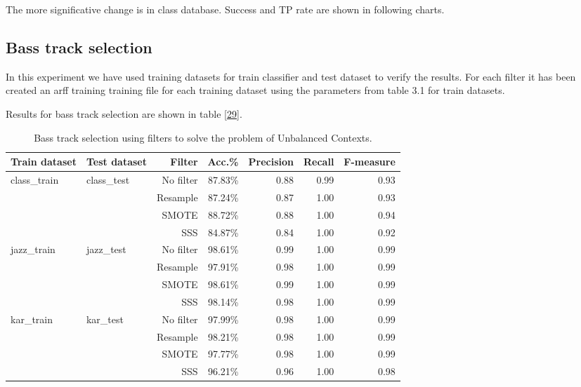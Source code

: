 \documentclass{article}
\begin{document}
The more significative change is in class database. Success and TP rate are shown in following charts.



\subsection{Bass track selection}

In this experiment we have used training datasets for train classifier and test dataset to verify the results. For each filter it has been created an arff training training file for each training dataset using the parameters from table 3.1 for train datasets.

Results for bass track selection are shown in table \ref{29}.

\begin{table}
\small
\begin{center}
\begin{tabular}{  l | l | r | r | r | r | r }
\hline
Train dataset & Test dataset & Filter & Acc.\% & Precision & Recall & F-measure \\
\hline
\hline
class\_train & class\_test & No filter & 87.83\% & 0.88 & 0.99 & 0.93 \\
 &  & Resample & 87.24\% & 0.87 & 1.00 & 0.93 \\
 &  & SMOTE & 88.72\% & 0.88 & 1.00 & 0.94 \\
 &  & SSS & 84.87\% & 0.84 & 1.00 & 0.92 \\
\hline
jazz\_train & jazz\_test & No filter & 98.61\% & 0.99 & 1.00 & 0.99 \\
 &  & Resample & 97.91\% & 0.98 & 1.00 & 0.99 \\
 &  & SMOTE & 98.61\% & 0.99 & 1.00 & 0.99 \\
 &  & SSS & 98.14\% & 0.98 & 1.00 & 0.99 \\
\hline
kar\_train & kar\_test & No filter & 97.99\% & 0.98 & 1.00 & 0.99 \\
 &  & Resample & 98.21\% & 0.98 & 1.00 & 0.99 \\
 &  & SMOTE & 97.77\% & 0.98 & 1.00 & 0.99 \\
 &  & SSS & 96.21\% & 0.96 & 1.00 & 0.98 \\
\hline
\end{tabular}
\caption{Bass track selection using filters to solve the problem of Unbalanced Contexts.}
\label{table29}
\end{center}
\end{table}
\end{document}
